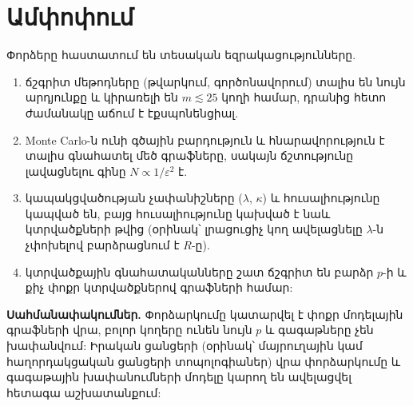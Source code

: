 \section{Ամփոփում}

Փորձերը հաստատում են տեսական եզրակացությունները.
\begin{enumerate}
  \item ճշգրիտ մեթոդները (թվարկում, գործոնավորում) տալիս են նույն արդյունքը և կիրառելի են $m\lesssim25$ կողի համար, դրանից հետո ժամանակը աճում է էքսպոնենցիալ.
  \item Monte Carlo-ն ունի գծային բարդություն և հնարավորություն է տալիս գնահատել մեծ գրաֆները, սակայն ճշտությունը լավացնելու գինը $N\propto1/\varepsilon^2$ է.
  \item կապակցվածության չափանիշները ($\lambda$, $\kappa$) և հուսալիությունը կապված են, բայց հուսալիությունը կախված է նաև կտրվածքների թվից (օրինակ՝ լրացուցիչ կող ավելացնելը $\lambda$-ն չփոխելով բարձրացնում է $R$-ը).
  \item կտրվածքային գնահատականները շատ ճշգրիտ են բարձր $p$-ի և քիչ փոքր կտրվածքներով գրաֆների համար:
\end{enumerate}

\textbf{Սահմանափակումներ.} Փորձարկումը կատարվել է փոքր մոդելային գրաֆների վրա, բոլոր կողերը ունեն նույն $p$ և գագաթները չեն խափանվում: Իրական ցանցերի (օրինակ՝ մայրուղային կամ հաղորդակցական ցանցերի տոպոլոգիաներ) վրա փորձարկումը և գագաթային խափանումների մոդելը կարող են ավելացվել հետագա աշխատանքում:
